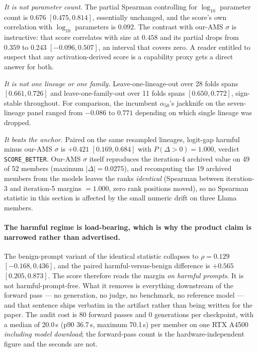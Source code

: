 \documentclass[11pt,letterpaper]{article}
\begin{document}
\emph{It is not parameter count.} The partial Spearman controlling for $\log_{10}$ parameter count is $0.676$ $[0.475, 0.814]$, essentially unchanged, and the score's own correlation with $\log_{10}$ parameters is $0.092$. The contrast with our-AMS $\sigma$ is instructive: that score correlates with size at $0.458$ and its partial drops from $0.359$ to $0.243$ $[-0.096, 0.507]$, an interval that covers zero. A reader entitled to suspect that any activation-derived score is a capability proxy gets a direct answer for both.

\emph{It is not one lineage or one family.} Leave-one-lineage-out over 28 folds spans $[0.661, 0.726]$ and leave-one-family-out over 11 folds spans $[0.650, 0.772]$, sign-stable throughout. For comparison, the incumbent $\alpha_{50}$'s jackknife on the seven-lineage panel ranged from $-0.086$ to $0.771$ depending on which single lineage was dropped.

\emph{It beats the anchor.} Paired on the same resampled lineages, logit-gap harmful minus our-AMS $\sigma$ is $+0.421$ $[0.169, 0.684]$ with $P(\Delta > 0) = 1.000$, verdict \texttt{SCORE\_BETTER}. Our-AMS $\sigma$ itself reproduces the iteration-4 archived value on 49 of 52 members (maximum $|\Delta| = 0.0275$), and recomputing the 19 archived members from the models leaves the ranks \emph{identical} (Spearman between iteration-3 and iteration-5 margins $= 1.000$, zero rank positions moved), so no Spearman statistic in this section is affected by the small numeric drift on three Llama members.

\paragraph{The harmful regime is load-bearing, which is why the product claim is narrowed rather than advertised.} The benign-prompt variant of the identical statistic collapses to $\rho = 0.129$ $[-0.168, 0.436]$, and the paired harmful-versus-benign difference is $+0.565$ $[0.205, 0.873]$. The score therefore reads the margin \emph{on harmful prompts}. It is not harmful-prompt-free. What it removes is everything downstream of the forward pass --- no generation, no judge, no benchmark, no reference model --- and that sentence ships verbatim in the artifact rather than being written for the paper. The audit cost is 80 forward passes and 0 generations per checkpoint, with a median of 20.0\,s (p90 36.7\,s, maximum 70.1\,s) per member on one RTX A4500 \emph{including model download}; the forward-pass count is the hardware-independent figure and the seconds are not.
\end{document}
